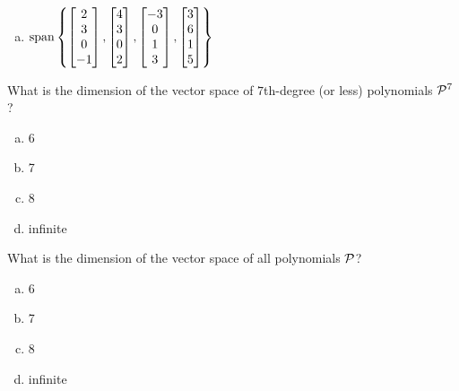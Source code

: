 \begin{applicationActivities}{3}{14}
\begin{activity}{15}
\begin{multicols}{3}
\begin{enumerate}[a)]
    \item \(\vspan\left\{
    \begin{bmatrix}2\\3\\0\\-1\end{bmatrix},
    \begin{bmatrix}4\\3\\0\\2\end{bmatrix},
    \begin{bmatrix}-3\\0\\1\\3\end{bmatrix},
    \begin{bmatrix}3\\6\\1\\5\end{bmatrix}
    \right\}
    \)
  \end{enumerate}
  \end{multicols}
\end{activity}

\begin{activity}{5}
  What is the dimension of the vector space of \(7\)th-degree (or less)
  polynomials \(\P^7\)?
  \begin{multicols}{4}
    \begin{enumerate}[a)]
      \item 6
      \item 7
      \item 8
      \item infinite
    \end{enumerate}
  \end{multicols}
\end{activity}

\begin{activity}{5}
  What is the dimension of the vector space of all polynomials
  \(\P\)?
  \begin{multicols}{4}
    \begin{enumerate}[a)]
      \item 6
      \item 7
      \item 8
      \item infinite
    \end{enumerate}
  \end{multicols}
\end{activity}


\end{applicationActivities}
